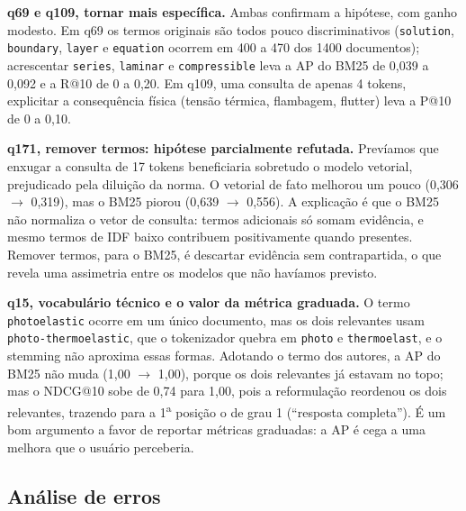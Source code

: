 \documentclass[10pt,twocolumn,a4paper]{article}
\begin{document}
\textbf{q69 e q109, tornar mais específica.} Ambas confirmam a hipótese, com
ganho modesto. Em q69 os termos originais são todos pouco discriminativos
(\texttt{solution}, \texttt{boundary}, \texttt{layer} e \texttt{equation} ocorrem
em 400 a 470 dos 1400 documentos); acrescentar \texttt{series}, \texttt{laminar}
e \texttt{compressible} leva a AP do BM25 de 0,039 a 0,092 e a R@10 de 0 a 0,20.
Em q109, uma consulta de apenas 4 tokens, explicitar a consequência física
(tensão térmica, flambagem, flutter) leva a P@10 de 0 a 0,10.

\textbf{q171, remover termos: hipótese parcialmente refutada.} Prevíamos que
enxugar a consulta de 17 tokens beneficiaria sobretudo o modelo vetorial,
prejudicado pela diluição da norma. O vetorial de fato melhorou um pouco
(0,306 $\to$ 0,319), mas o BM25 piorou (0,639 $\to$ 0,556). A explicação é que o
BM25 não normaliza o vetor de consulta: termos adicionais só somam evidência, e
mesmo termos de IDF baixo contribuem positivamente quando presentes. Remover
termos, para o BM25, é descartar evidência sem contrapartida, o que revela uma
assimetria entre os modelos que não havíamos previsto.

\textbf{q15, vocabulário técnico e o valor da métrica graduada.} O termo
\texttt{photoelastic} ocorre em um único documento, mas os dois relevantes usam
\texttt{photo-thermoelastic}, que o tokenizador quebra em \texttt{photo} e
\texttt{thermoelast}, e o stemming não aproxima essas formas. Adotando o termo
dos autores, a AP do BM25 não muda (1,00 $\to$ 1,00), porque os dois relevantes
já estavam no topo; mas o NDCG@10 sobe de 0,74 para 1,00, pois a reformulação
reordenou os dois relevantes, trazendo para a 1\textsuperscript{a} posição o de
grau 1 (``resposta completa''). É um bom argumento a favor de reportar métricas
graduadas: a AP é cega a uma melhora que o usuário perceberia.

\subsection{Análise de erros}
\end{document}
